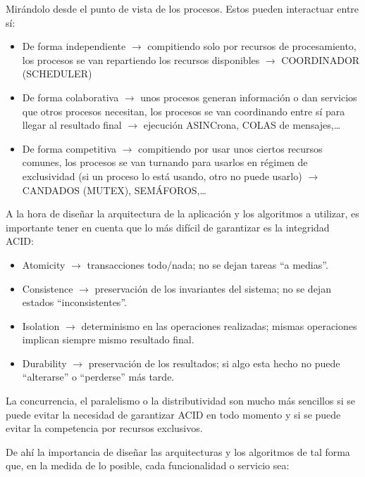 \documentclass[spanish,12pt,a4paper,final,oneside]{book}
\begin{document}
Mirándolo desde el punto de vista de los procesos. Estos pueden interactuar entre sí:

\begin{itemize}

\item De forma independiente $\rightarrow$ compitiendo solo por recursos de procesamiento, los procesos se van repartiendo los recursos disponibles $\rightarrow$ COORDINADOR (SCHEDULER)


\item De forma colaborativa $\rightarrow$ unos procesos generan información o dan servicios que otros procesos necesitan, los procesos se van coordinando entre sí para llegar al resultado final $\rightarrow$ ejecución ASINCrona, COLAS de mensajes,\ldots

\item De forma competitiva $\rightarrow$  compitiendo por usar unos ciertos recursos comunes, los procesos se van turnando para usarlos en régimen de exclusividad (si un proceso lo está usando, otro no puede usarlo) $\rightarrow$ CANDADOS (MUTEX), SEMÁFOROS,\ldots

\end{itemize}

A la hora de diseñar la arquitectura de la aplicación y los algoritmos a utilizar, es importante tener en cuenta que lo más difícil de garantizar es la integridad ACID:

\begin{itemize}
\item Atomicity $\rightarrow$ transacciones todo/nada; no se dejan tareas ``a medias''.
\item Consistence $\rightarrow$ preservación de los invariantes del sistema; no se dejan estados ``inconsistentes''.
\item Isolation $\rightarrow$ determinismo en las operaciones realizadas; mismas operaciones implican siempre mismo resultado final.
\item Durability $\rightarrow$ preservación de los resultados; si algo esta hecho no puede ``alterarse'' o ``perderse'' más tarde.
\end{itemize}

La concurrencia, el paralelismo o la distributividad son mucho más sencillos si se puede evitar la necesidad de garantizar ACID en todo momento y si se puede evitar la competencia por recursos exclusivos.

De ahí la importancia de diseñar las arquitecturas y los algoritmos de tal forma que, en la medida de lo posible, cada funcionalidad o servicio sea:
\end{document}
